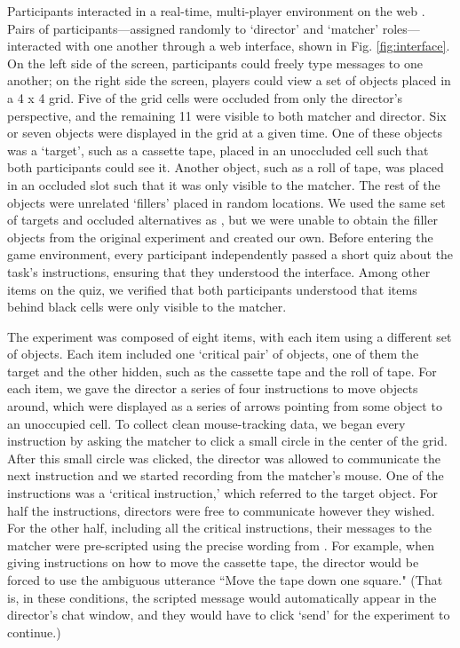 \documentclass[10pt,letterpaper]{article}
\begin{document}
Participants interacted in a real-time, multi-player environment on the web \cite{Hawkins15_RealTimeWebExperiments}. 
Pairs of participants---assigned randomly to `director' and `matcher' roles---interacted with one another through a web interface, shown in Fig. \ref{fig:interface}. On the left side of the screen, participants could freely type messages to one another; on the right side the screen, players could view a set of objects placed in a 4 x 4 grid. Five of the grid cells were occluded from only the director's perspective, and the remaining 11 were visible to both matcher and director. Six or seven objects were displayed in the grid at a given time. One of these objects was a `target', such as a cassette tape, placed in an unoccluded cell such that both participants could see it. Another object, such as a roll of tape, was placed in an occluded slot such that it was only visible to the matcher. The rest of the objects were unrelated `fillers' placed in random locations. We used the same set of targets and occluded alternatives as , but we were unable to obtain the filler objects from the original experiment and created our own.
Before entering the game environment, every participant independently passed a short quiz about the task's instructions, ensuring that they understood the interface. Among other items on the quiz, we verified that both participants understood that items behind black cells were only visible to the matcher. 

The experiment was composed of eight items, with each item using a different set of objects. Each item included one `critical pair' of objects, one of them the target and the other hidden, such as the cassette tape and the roll of tape. For each item, we gave the director a series of four instructions to move objects around, which were displayed as a series of arrows pointing from some object to an unoccupied cell. 
To collect clean mouse-tracking data, we began every instruction by asking the matcher to click a small circle in the center of the grid. After this small circle was clicked, the director was allowed to communicate the next instruction and we started recording from the matcher's mouse. 
One of the instructions was a `critical instruction,' which referred to the target object.
For half the instructions, directors were free to communicate however they wished. For the other half, including all the critical instructions, their messages to the matcher were pre-scripted using the precise wording from . For example, when giving instructions on how to move the cassette tape, the director would be forced to use the ambiguous utterance ``Move the tape down one square." (That is, in these conditions, the scripted message would automatically appear in the director's chat window, and they would have to click `send' for the experiment to continue.)
\end{document}

